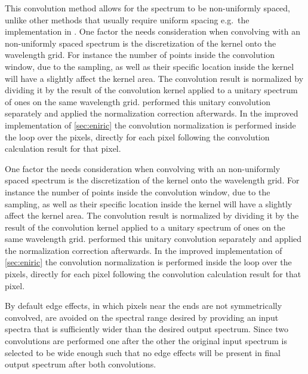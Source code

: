 This convolution method allows for the spectrum to be non-uniformly spaced, unlike other methods that usually require uniform spacing e.g.\ the implementation in \pyastronomy{}.
One factor the needs consideration when convolving with an non-uniformly spaced spectrum is the discretization of the kernel onto the wavelength grid.
For instance the number of points inside the convolution window, due to the sampling, as well as their specific location inside the kernel will have a slightly affect the kernel area.
The convolution result is normalized by dividing it by the result of the convolution kernel applied to a unitary spectrum of ones on the same wavelength grid.
\citet{figueira_radial_2016} performed this unitary convolution separately and applied the normalization correction afterwards.
In the improved implementation of \cref{sec:eniric} the convolution normalization is performed inside the loop over the pixels, directly for each pixel following the convolution calculation result for that pixel.

One factor the needs consideration when convolving with an non-uniformly spaced spectrum is the discretization of the kernel onto the wavelength grid.
For instance the number of points inside the convolution window, due to the sampling, as well as their specific location inside the kernel will have a slightly affect the kernel area.
The convolution result is normalized by dividing it by the result of the convolution kernel applied to a unitary spectrum of ones on the same wavelength grid.
\citet{figueira_radial_2016} performed this unitary convolution separately and applied the normalization correction afterwards.
In the improved implementation of \cref{sec:eniric} the convolution normalization is performed inside the loop over the pixels, directly for each pixel following the convolution calculation result for that pixel.

By default edge effects, in which pixels near the ends are not symmetrically convolved, are avoided on the spectral range desired by providing an input spectra that is sufficiently wider than the desired output spectrum.
Since two convolutions are performed one after the other the original input spectrum is selected to be wide enough such that no edge effects will be present in final output spectrum after both convolutions.

